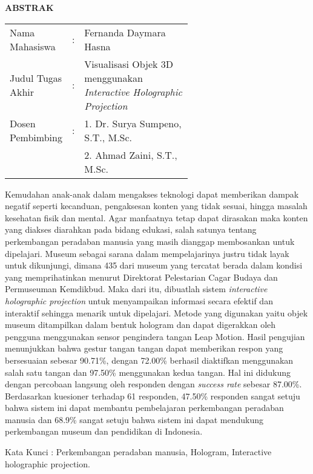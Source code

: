 \begin{center}
\Large\textbf{ABSTRAK}
\end{center}
\vspace{1ex}

\begin{adjustwidth}{-0.2cm}{}
\begin{tabular}{lcp{0.6\linewidth}}
	Nama Mahasiswa &:& Fernanda Daymara Hasna \\
	Judul Tugas Akhir &:& Visualisasi Objek 3D menggunakan \textit{Interactive Holographic Projection}\\
	Dosen Pembimbing &:& 1. Dr. Surya Sumpeno, S.T., M.Sc. \\
	& & 2. Ahmad Zaini, S.T., M.Sc.  \\
\end{tabular}
\end{adjustwidth}
\vspace{1ex}

\setlength{\parindent}{0cm} Kemudahan anak-anak dalam mengakses teknologi dapat memberikan dampak negatif seperti kecanduan, pengaksesan konten yang tidak sesuai, hingga masalah kesehatan fisik dan mental\cite{sundus2018impact}. Agar manfaatnya tetap dapat dirasakan maka konten yang diakses diarahkan pada bidang edukasi, salah satunya tentang perkembangan peradaban manusia yang masih dianggap membosankan untuk dipelajari\cite{wirawan_2018}. Museum sebagai sarana dalam mempelajarinya justru tidak layak untuk dikunjungi, dimana 435 dari museum yang tercatat berada dalam kondisi yang memprihatinkan menurut Direktorat Pelestarian Cagar Budaya dan Permuseuman Kemdikbud\cite{kemendikbud_2019}. Maka dari itu, dibuatlah sistem \textit{interactive holographic projection} untuk menyampaikan informasi secara efektif dan interaktif sehingga menarik untuk dipelajari. Metode yang digunakan yaitu objek museum ditampilkan dalam bentuk hologram dan dapat digerakkan oleh pengguna menggunakan sensor pengindera tangan Leap Motion. Hasil pengujian menunjukkan bahwa gestur tangan tangan dapat memberikan respon yang bersesuaian sebesar 90.71\%, dengan 72.00\% berhasil diaktifkan menggunakan salah satu tangan dan 97.50\% menggunakan kedua tangan. Hal ini didukung dengan percobaan langsung oleh responden dengan \textit{success rate} sebesar 87.00\%. Berdasarkan kuesioner terhadap 61 responden, 47.50\% responden sangat setuju bahwa sistem ini dapat membantu pembelajaran perkembangan peradaban manusia dan 68.9\% sangat setuju bahwa sistem ini dapat mendukung perkembangan museum dan pendidikan di Indonesia.
\vspace{2ex}

Kata Kunci : Perkembangan peradaban manusia, Hologram, Interactive holographic projection.
\newpage
